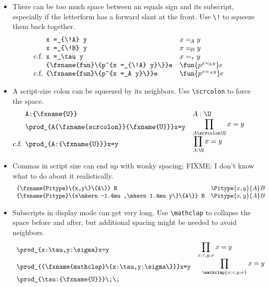\documentclass[11pt]{article} %
\makeatletter
\newcommand\ldisplaycell[1]{\begin{array}[c]{@{}l@{}}\displaystyle {#1}\end{array}}
\theoremstyle{definition}
\theoremstyle{remark}
\makeatother
\begin{document}
\begin{itemize}
\item
  There can be too much space between an equals sign and its subscript, especially if the letterform has a forward slant at the front.
  Use \verb/\!/ to squeeze them back together.
  \[\begin{array}{lll}
    \verb/x =_{\!A} y/ & x =_{\!A} y \\
    \verb/x =_{\!B} y/ & x =_{\!B} y \\
    \llap{c.f. }\verb/x =_\tau y/ & x =_\tau y \\
    \verb/\fun{p^{x =_{\!A} y}}e/ & \fun{p^{x =_{\!A} y}}e \\
    \llap{c.f. }\verb/\fun{p^{x =_A y}}e/ & \fun{p^{x =_A y}}e \\
  \end{array}\]
\item
  A script-size colon can be squeezed by its neighbors.
  Use \verb/\scrcolon/ to force the space.
  \[\begin{array}{lll}
    \verb/A:\U/ & A:\U \\
    \verb/\prod_{A\scrcolon\U}x=y/ & \ldisplaycell{ \prod_{A\scrcolon\U}x=y } \\
    \llap{c.f. }\verb/\prod_{A:\U}x=y/ & \ldisplaycell{ \prod_{A:\U}x=y } \\
  \end{array}\]
\item
  Commas in script size can end up with wonky spacing;
  FIXME: I don't know what to do about it realistically.
  \[\begin{array}{lll}
    \verb/\Pitype{x,y}{A} B/ & \Pitype{x,y}{A} B \\
    \verb/\Pitype{x\mkern -1.4mu ,\mkern 1.4mu y}{A} B/ & \Pitype{x\mkern -1.4mu ,\mkern 1.4mu y}{A} B \\
  \end{array}\]
\item
  Subscripts in display mode can get very long.
  Use \verb/\mathclap/ to collapse the space before and after, but additional spacing might be needed to avoid neighbors.
  \[\begin{array}{lll}
    \verb/\prod_{x:\tau,y:\sigma}x=y/ & \ldisplaycell{ \prod_{x:\tau,y:\sigma}x=y } \\
    \verb/\prod_{\mathclap{x:\tau,y:\sigma}}x=y/ & \ldisplaycell{\;\:\, \prod_{\mathclap{ x:\tau,y:\sigma}}x=y } \\
    \begin{array}[c]{@{}l@{}}
        \verb/\prod_{\tau:\U}\;\;/ \\

\end{array}
\end{array}\]
\end{itemize}
\end{document}
